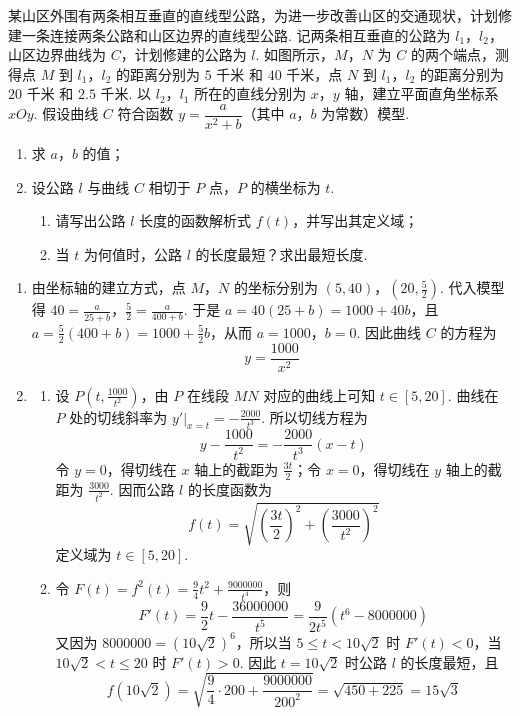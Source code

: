\begin{problem}
某山区外围有两条相互垂直的直线型公路，为进一步改善山区的交通现状，计划修建一条连接两条公路和山区边界的直线型公路. 记两条相互垂直的公路为 \(l_1\)，\(l_2\)，山区边界曲线为 \(C\)，计划修建的公路为 \(l\). 如图所示，\(M\)，\(N\) 为 \(C\) 的两个端点，测得点 \(M\) 到 \(l_1\)，\(l_2\) 的距离分别为 \(5\text{ 千米}\) 和 \(40\text{ 千米}\)，点 \(N\) 到 \(l_1\)，\(l_2\) 的距离分别为 \(20\text{ 千米}\) 和 \(2.5\text{ 千米}\). 以 \(l_2\)，\(l_1\) 所在的直线分别为 \(x\)，\(y\) 轴，建立平面直角坐标系 \(xOy\). 假设曲线 \(C\) 符合函数 \(y = \dfrac{a}{x^2 + b}\)（其中 \(a\)，\(b\) 为常数）模型.

\begin{enumerate}
\item 求 \(a\)，\(b\) 的值；
\item 设公路 \(l\) 与曲线 \(C\) 相切于 \(P\) 点，\(P\) 的横坐标为 \(t\).
\begin{enumerate}
\item 请写出公路 \(l\) 长度的函数解析式 \(f(t)\)，并写出其定义域；
\item 当 \(t\) 为何值时，公路 \(l\) 的长度最短？求出最短长度.
\end{enumerate}
\end{enumerate}

\end{problem}

\begin{solution}
\begin{enumerate}
\item
由坐标轴的建立方式，点 \(M\)，\(N\) 的坐标分别为 \((5,40)\)，\(\left(20,\frac52\right)\). 代入模型得 \(40=\frac{a}{25+b}\)，\(\frac52=\frac{a}{400+b}\).
于是 \(a=40(25+b)=1000+40b\)，且 \(a=\frac52(400+b)=1000+\frac52b\)，从而 \(a=1000\)，\(b=0\). 因此曲线 \(C\) 的方程为
\[
y=\frac{1000}{x^{2}}
\]

\item
\begin{enumerate}
\item
设 \(P\left(t,\frac{1000}{t^{2}}\right)\)，由 \(P\) 在线段 \(MN\) 对应的曲线上可知 \(t\in\left[5,20\right]\). 曲线在 \(P\) 处的切线斜率为 \(y'\big|_{x=t}=-\frac{2000}{t^{3}}\).
所以切线方程为
\[
y-\frac{1000}{t^{2}}=-\frac{2000}{t^{3}}(x-t)
\]
令 \(y=0\)，得切线在 \(x\) 轴上的截距为 \(\frac{3t}{2}\)；令 \(x=0\)，得切线在 \(y\) 轴上的截距为 \(\frac{3000}{t^{2}}\). 因而公路 \(l\) 的长度函数为
\[
f(t)=\sqrt{\left(\frac{3t}{2}\right)^{2}+\left(\frac{3000}{t^{2}}\right)^{2}}
\]
定义域为 \(t\in\left[5,20\right]\).
\item
令 \(F(t)=f^{2}(t)=\frac94t^{2}+\frac{9000000}{t^{4}}\)，则
\[
F'(t)=\frac92t-\frac{36000000}{t^{5}}=\frac{9}{2t^{5}}\left(t^{6}-8000000\right)
\]
又因为 \(8000000=(10\sqrt2)^{6}\)，所以当 \(5\leqslant t<10\sqrt2\) 时 \(F'(t)<0\)，当 \(10\sqrt2<t\leqslant20\) 时 \(F'(t)>0\). 因此 \(t=10\sqrt2\) 时公路 \(l\) 的长度最短，且
\[
f(10\sqrt2)=\sqrt{\frac94\cdot200+\frac{9000000}{200^{2}}}=\sqrt{450+225}=15\sqrt3
\]
\end{enumerate}
\end{enumerate}
\end{solution}

